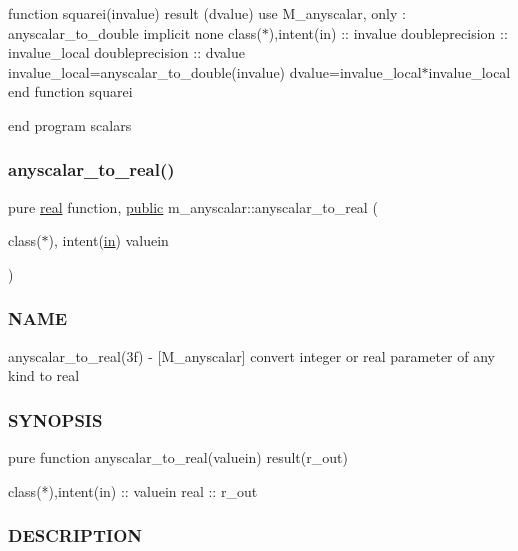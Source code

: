 function squarei(invalue) result (dvalue) use M\+\_\+anyscalar, only \+: anyscalar\+\_\+to\+\_\+double implicit none class($\ast$),intent(in) \+:\+: invalue doubleprecision \+:\+: invalue\+\_\+local doubleprecision \+:\+: dvalue invalue\+\_\+local=anyscalar\+\_\+to\+\_\+double(invalue) dvalue=invalue\+\_\+local$\ast$invalue\+\_\+local end function squarei

end program scalars \mbox{\label{namespacem__anyscalar_a39cd9a778fff85974fa1a822b92555fd}} 
\subsubsection{\texorpdfstring{anyscalar\+\_\+to\+\_\+real()}{anyscalar\_to\_real()}}
{\footnotesize\ttfamily pure \hyperlink{read__watch_83_8txt_abdb62bde002f38ef75f810d3a905a823}{real} function, \hyperlink{M__stopwatch_83_8txt_a2f74811300c361e53b430611a7d1769f}{public} m\+\_\+anyscalar\+::anyscalar\+\_\+to\+\_\+real (\begin{DoxyParamCaption}\item[{class($\ast$), intent(\hyperlink{M__journal_83_8txt_afce72651d1eed785a2132bee863b2f38}{in})}]{valuein }\end{DoxyParamCaption})}



\subsubsection*{N\+A\+ME}

anyscalar\+\_\+to\+\_\+real(3f) -\/ \mbox{[}M\+\_\+anyscalar\mbox{]} convert integer or real parameter of any kind to real 

\subsubsection*{S\+Y\+N\+O\+P\+S\+IS}

\begin{DoxyVerb}pure function anyscalar_to_real(valuein) result(r_out)

 class(*),intent(in)  :: valuein
 real                 :: r_out
\end{DoxyVerb}


\subsubsection*{D\+E\+S\+C\+R\+I\+P\+T\+I\+ON}

